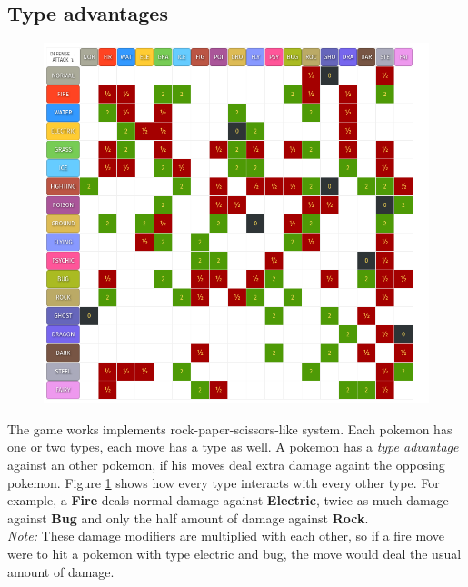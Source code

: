 \documentclass{article}
\begin{document}
\subsection{Type advantages}
\begin{figure}[ht]
  \centering
  \includegraphics[width=.9\linewidth]{images/Types.png}
  \label{fig:type-chart}
\end{figure}
The game works implements rock-paper-scissors-like system. Each pokemon has one
or two types, each move has a type as well. A pokemon has a \textit{type advantage}
against an other pokemon, if his moves deal extra damage againt the opposing pokemon.
Figure \ref{fig:type-chart} shows how every type interacts with every other type.
For example, a \textbf{Fire} deals normal damage against \textbf{Electric}, twice
as much damage against \textbf{Bug} and only the half amount of damage against
\textbf{Rock}. \\
\textit{Note:} These damage modifiers are multiplied with each other, so if a 
fire move were to hit a pokemon with type electric and bug, the move would
deal the usual amount of damage.
\end{document}
